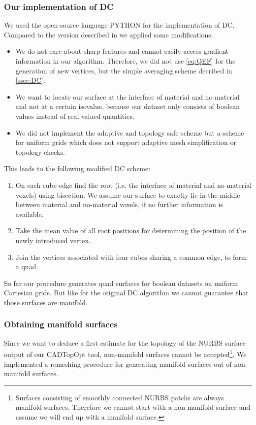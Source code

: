 \subsubsection{Our implementation of \ac{DC}}
We used the open-source language PYTHON \cite{Python} for the implementation of \ac{DC}. Compared to the version described in \cite{Hermite2002} we applied some modifications:
\begin{itemize}
\item We do not care about sharp features and cannot easily access gradient information in our algorithm. Therefore, we did not use \autoref{eq:QEF} for the generation of new vertices, but the simple averaging scheme decribed in \autoref{ssec:DC}.
\item We want to locate our surface at the interface of material and no-material and not at a certain isovalue, because our dataset only consists of boolean values instead of real valued quantities.
\item We did not implement the adaptive and topology safe scheme but a scheme for uniform grids which does not support adaptive mesh simplification or topology checks.
\end{itemize}
This leads to the following modified \ac{DC} scheme:
\begin{enumerate}
\item On each cube edge find the root (i.e. the interface of material and no-material voxels) using bisection. We assume our surface to exactly lie in the middle between material and no-material voxels, if no further information is available.
\item Take the mean value of all root positions for determining the position of the newly introduced vertex.
\item Join the vertices associated with four cubes sharing a common edge, to form a \ac{quad}.
\end{enumerate}
So far our procedure generates \ac{quad} surfaces for boolean datasets on uniform Cartesian grids. But like for the original \ac{DC} algorithm we cannot guarantee that those surfaces are manifold.

\subsubsection{Obtaining manifold surfaces}
Since we want to deduce a first estimate for the topology of the \ac{NURBS} surface output of our \ac{CADTopOpt} tool, non-manifold surfaces cannot be accepted\footnote{Surfaces consisting of smoothly connected \ac{NURBS} \acp{patch} are always manifold surfaces. Therefore we cannot start with a non-manifold surface and assume we will end up with a manifold surface.}. We implemented a remeshing procedure for generating manifold surfaces out of non-manifold surfaces.

